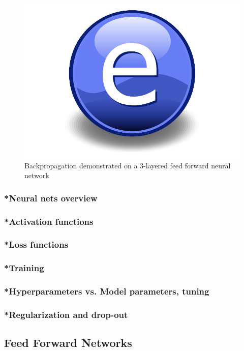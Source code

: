 \begin{figure}
    \centering
    \includegraphics{Figures/Electron.pdf}
    \caption{Backpropagation demonstrated on a 3-layered feed forward neural network}
    \label{fig:backprop}
\end{figure}


\subsubsection{*Neural nets overview}
\subsubsection{*Activation functions}
\subsubsection{*Loss functions}
\subsubsection{*Training}
\subsubsection{*Hyperparameters vs. Model parameters, tuning}
\subsubsection{*Regularization and drop-out}
\subsection{Feed Forward Networks}
